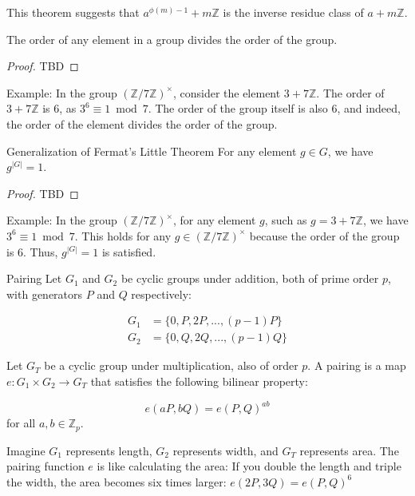 \documentclass{article}
\begin{document}
This theorem suggests that $a^{\phi(m) - 1} + m \mathbb{Z}$ is the inverse residue class of $a + m \mathbb{Z}$.

\begin{theorem}{}{} The order of any element in a group divides the order of the group. \end{theorem}

\begin{proof}
    TBD
\end{proof}

Example: In the group $(\mathbb{Z}/7\mathbb{Z})^{\times}$, consider the element $3 + 7\mathbb{Z}$. The order of $3 + 7\mathbb{Z}$ is 6, as $3^6 \equiv 1 \bmod 7$. The order of the group itself is also 6, and indeed, the order of the element divides the order of the group.

\begin{theorem}{Generalization of Fermat's Little Theorem}{} For any element $g \in G$, we have $g^{|G|} = 1$. \end{theorem}

\begin{proof}
    TBD
\end{proof}

Example: In the group $(\mathbb{Z}/7\mathbb{Z})^{\times}$, for any element $g$, such as $g = 3 + 7\mathbb{Z}$, we have $3^6 \equiv 1 \bmod 7$. This holds for any $g \in (\mathbb{Z}/7\mathbb{Z})^{\times}$ because the order of the group is 6. Thus, $g^{|G|} = 1$ is satisfied.

\begin{definition}{Pairing}{}
Let $G_1$ and $G_2$ be cyclic groups under addition, both of prime order $p$, with generators $P$ and $Q$ respectively:

    \begin{align}
        G_1 &= \{0, P, 2P, ..., (p-1)P\} \\
        G_2 &= \{0, Q, 2Q, ..., (p-1)Q\}
    \end{align}

Let $G_T$ be a cyclic group under multiplication, also of order $p$.
A pairing is a map $e: G_1 \times G_2 \rightarrow G_T$ that satisfies the following bilinear property:

    \begin{equation}
        e(aP, bQ) = e(P, Q)^{ab}
    \end{equation} for all $a, b \in \mathbb{Z}_p$.
\end{definition}

Imagine $G_1$ represents length, $G_2$ represents width, and $G_T$ represents area. The pairing function $e$ is like calculating the area: If you double the length and triple the width, the area becomes six times larger: $e(2P, 3Q) = e(P, Q)^{6}$
\end{document}
